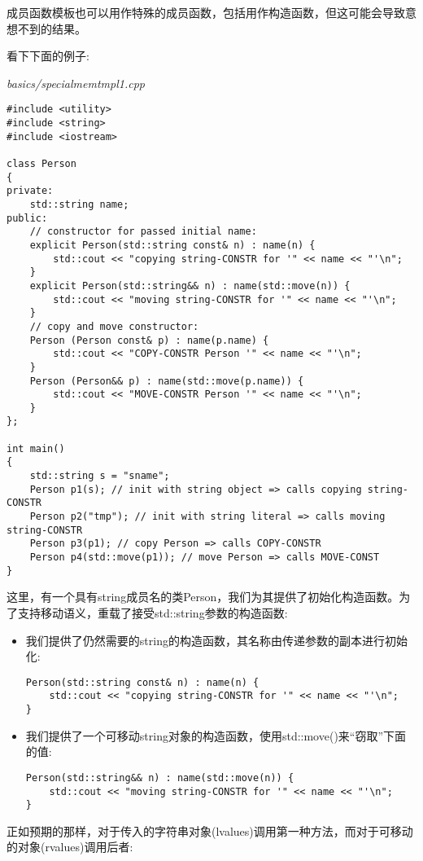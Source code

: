 成员函数模板也可以用作特殊的成员函数，包括用作构造函数，但这可能会导致意想不到的结果。

看下下面的例子:

\noindent
\textit{basics/specialmemtmpl1.cpp}
\begin{lstlisting}[style=styleCXX]
#include <utility>
#include <string>
#include <iostream>

class Person
{
private:
	std::string name;
public:
	// constructor for passed initial name:
	explicit Person(std::string const& n) : name(n) {
		std::cout << "copying string-CONSTR for '" << name << "'\n";
	}
	explicit Person(std::string&& n) : name(std::move(n)) {
		std::cout << "moving string-CONSTR for '" << name << "'\n";
	}
	// copy and move constructor:
	Person (Person const& p) : name(p.name) {
		std::cout << "COPY-CONSTR Person '" << name << "'\n";
	}
	Person (Person&& p) : name(std::move(p.name)) {
		std::cout << "MOVE-CONSTR Person '" << name << "'\n";
	}
};

int main()
{
	std::string s = "sname";
	Person p1(s); // init with string object => calls copying string-CONSTR
	Person p2("tmp"); // init with string literal => calls moving string-CONSTR
	Person p3(p1); // copy Person => calls COPY-CONSTR
	Person p4(std::move(p1)); // move Person => calls MOVE-CONST
}
\end{lstlisting}

这里，有一个具有string成员名的类Person，我们为其提供了初始化构造函数。为了支持移动语义，重载了接受std::string参数的构造函数:

\begin{itemize}
\item 
我们提供了仍然需要的string的构造函数，其名称由传递参数的副本进行初始化:

\begin{lstlisting}[style=styleCXX]
Person(std::string const& n) : name(n) {
	std::cout << "copying string-CONSTR for '" << name << "'\n";
}
\end{lstlisting}

\item 
我们提供了一个可移动string对象的构造函数，使用std::move()来“窃取”下面的值:

\begin{lstlisting}[style=styleCXX]
Person(std::string&& n) : name(std::move(n)) {
	std::cout << "moving string-CONSTR for '" << name << "'\n";
}
\end{lstlisting}
\end{itemize}

正如预期的那样，对于传入的字符串对象(lvalues)调用第一种方法，而对于可移动的对象(rvalues)调用后者:

